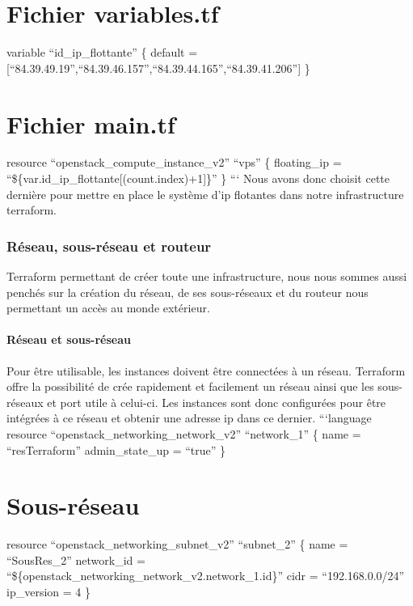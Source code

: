 \documentclass[]{article}
\let\oldparagraph\paragraph
\renewcommand{\paragraph}[1]{\oldparagraph{#1}\mbox{}}
\begin{document}
\section{Fichier variables.tf}\label{fichier-variables.tf}

variable ``id\_ip\_flottante'' \{ default =
{[}``84.39.49.19'',``84.39.46.157'',``84.39.44.165'',``84.39.41.206''{]}
\}

\section{Fichier main.tf}\label{fichier-main.tf}

resource ``openstack\_compute\_instance\_v2'' ``vps'' \{ floating\_ip =
``\$\{var.id\_ip\_flottante{[}(count.index)+1{]}\}'' \} ``` Nous avons
donc choisit cette dernière pour mettre en place le système d'ip
flotantes dans notre infrastructure terraform.

\subsubsection{Réseau, sous-réseau et
routeur}\label{ruxe9seau-sous-ruxe9seau-et-routeur}

Terraform permettant de créer toute une infrastructure, nous nous sommes
aussi penchés sur la création du réseau, de ses sous-réseaux et du
routeur nous permettant un accès au monde extérieur.

\paragraph{Réseau et sous-réseau}\label{ruxe9seau-et-sous-ruxe9seau}

Pour être utilisable, les instances doivent être connectées à un réseau.
Terraform offre la possibilité de crée rapidement et facilement un
réseau ainsi que les sous-réseaux et port utile à celui-ci. Les
instances sont donc configurées pour être intégrées à ce réseau et
obtenir une adresse ip dans ce dernier. ```language resource
``openstack\_networking\_network\_v2'' ``network\_1'' \{ name =
``resTerraform'' admin\_state\_up = ``true'' \}

\section{Sous-réseau}\label{sous-ruxe9seau}

resource ``openstack\_networking\_subnet\_v2'' ``subnet\_2'' \{ name =
``SousRes\_2'' network\_id =
``\$\{openstack\_networking\_network\_v2.network\_1.id\}'' cidr =
``192.168.0.0/24'' ip\_version = 4 \}
\end{document}
